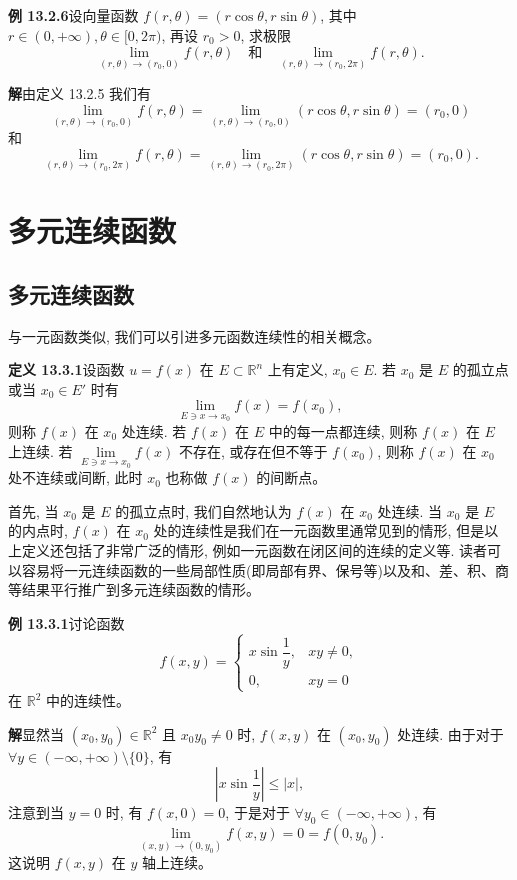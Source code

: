 \documentclass[UTF8, 12pt, fontset=fandol, oneside]{ctexart}
\begin{document}
\noindent\textbf{例 13.2.6}\quad 设向量函数 $f(r,\theta)=(r\cos\theta,r\sin\theta)$, 其中 $r\in(0,+\infty),\theta\in[0,2\pi)$, 再设 $r_0>0$, 求极限
\[
  \lim_{(r,\theta)\to(r_0,0)}f(r,\theta)
  \quad\text{和}\quad
  \lim_{(r,\theta)\to(r_0,2\pi)}f(r,\theta).
\]

\noindent\textbf{解}\quad 由定义 13.2.5 我们有
\[
  \lim_{(r,\theta)\to(r_0,0)}f(r,\theta)
  =\lim_{(r,\theta)\to(r_0,0)}(r\cos\theta,r\sin\theta)=(r_0,0)
\]
和
\[
  \lim_{(r,\theta)\to(r_0,2\pi)}f(r,\theta)
  =\lim_{(r,\theta)\to(r_0,2\pi)}(r\cos\theta,r\sin\theta)=(r_0,0).
\]

\section{多元连续函数}

\subsection{多元连续函数}

与一元函数类似, 我们可以引进多元函数连续性的相关概念。

\noindent\textbf{定义 13.3.1}\quad 设函数 $u=f(x)$ 在 $E\subset\mathbb R^n$ 上有定义, $x_0\in E$. 若 $x_0$ 是 $E$ 的孤立点或当 $x_0\in E'$ 时有
\[
  \lim_{E\ni x\to x_0}f(x)=f(x_0),
\]
则称 $f(x)$ 在 $x_0$ 处连续. 若 $f(x)$ 在 $E$ 中的每一点都连续, 则称 $f(x)$ 在 $E$ 上连续. 若 $\lim\limits_{E\ni x\to x_0}f(x)$ 不存在, 或存在但不等于 $f(x_0)$, 则称 $f(x)$ 在 $x_0$ 处不连续或间断, 此时 $x_0$ 也称做 $f(x)$ 的间断点。

首先, 当 $x_0$ 是 $E$ 的孤立点时, 我们自然地认为 $f(x)$ 在 $x_0$ 处连续. 当 $x_0$ 是 $E$ 的内点时, $f(x)$ 在 $x_0$ 处的连续性是我们在一元函数里通常见到的情形, 但是以上定义还包括了非常广泛的情形, 例如一元函数在闭区间的连续的定义等. 读者可以容易将一元连续函数的一些局部性质(即局部有界、保号等)以及和、差、积、商等结果平行推广到多元连续函数的情形。

\noindent\textbf{例 13.3.1}\quad 讨论函数
\[
  f(x,y)=
  \begin{cases}
    x\sin\dfrac1y, & xy\ne0,\\
    0, & xy=0
  \end{cases}
\]
在 $\mathbb R^2$ 中的连续性。

\noindent\textbf{解}\quad 显然当 $(x_0,y_0)\in\mathbb R^2$ 且 $x_0y_0\ne0$ 时, $f(x,y)$ 在 $(x_0,y_0)$ 处连续. 由于对于 $\forall y\in(-\infty,+\infty)\setminus\{0\}$, 有
\[
  \left|x\sin\frac1y\right|\leqslant |x|,
\]
注意到当 $y=0$ 时, 有 $f(x,0)=0$, 于是对于 $\forall y_0\in(-\infty,+\infty)$, 有
\[
  \lim_{(x,y)\to(0,y_0)}f(x,y)=0=f(0,y_0).
\]
这说明 $f(x,y)$ 在 $y$ 轴上连续。
\end{document}
